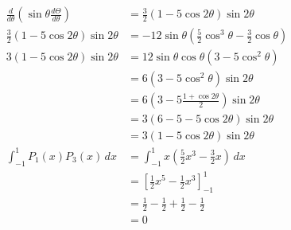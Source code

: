 \documentclass{article}
\begin{document}
\begin{align*}
  \frac{d}{d \theta} \left( \sin \theta \frac{d \Theta}{d \theta} \right) & = \frac{3}{2} (1 - 5 \cos 2 \theta) \sin 2 \theta                                    \\
  \frac{3}{2} (1 - 5 \cos 2 \theta) \sin 2 \theta                         & = -12 \sin \theta \left( \frac{5}{2} \cos^3 \theta - \frac{3}{2} \cos \theta \right) \\
  3 (1 - 5 \cos 2 \theta) \sin 2 \theta                                   & = 12 \sin \theta \cos \theta (3 - 5 \cos^2 \theta)                                   \\
                                                                          & = 6 (3 - 5 \cos^2 \theta) \sin 2 \theta                                              \\
                                                                          & = 6 \left( 3 - 5 \frac{1 + \cos 2 \theta}{2} \right) \sin 2 \theta                   \\
                                                                          & = 3 (6 - 5 - 5 \cos 2 \theta) \sin 2 \theta                                          \\
                                                                          & = 3 (1 - 5 \cos 2 \theta) \sin 2 \theta                                              \\
  \int_{-1}^1 P_1(x) P_3(x) \,d x                                         & = \int_{-1}^1 x \left( \frac{5}{2} x^3 - \frac{3}{2} x \right) \,d x                 \\
                                                                          & = \left[ \frac{1}{2} x^5 - \frac{1}{2} x^3 \right]_{-1}^1                            \\
                                                                          & = \frac{1}{2} - \frac{1}{2} + \frac{1}{2} - \frac{1}{2}                              \\
                                                                          & = 0
\end{align*}

\subsection{}
\end{document}
